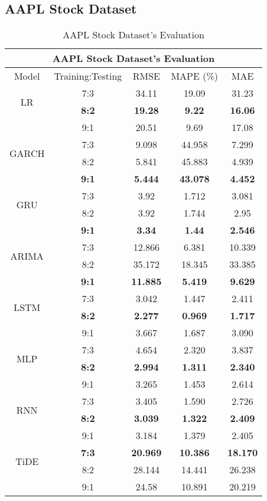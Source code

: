 \documentclass{ieeeojies}
\begin{document}
\subsection{AAPL Stock Dataset} 
\begin{table}[H]
    \centering
    \begin{tabular}{|c|c|c|c|c|}
         \hline
         \multicolumn{5}{|c|}{\textbf{AAPL Stock Dataset's Evaluation}}\\
         \hline
         \centering Model & Training:Testing & RMSE & MAPE (\%) & MAE\\
         \hline
         \multirow{2}{*}{LR} & 7:3 & 34.11 & 19.09 & 31.23 
         \\ & \textbf{8:2} & \textbf{19.28} & \textbf{9.22} & \textbf{16.06} 
         \\ & 9:1 & 20.51 & 9.69 & 17.08\\
         \hline
         \multirow{2}{*}{GARCH} & 7:3&9.098&44.958&7.299\\ & 8:2&5.841&45.883&4.939\\ & \textbf{9:1}& \textbf{5.444}& \textbf{43.078}& \textbf{4.452}\\
         \hline
         \multirow{2}{*}{GRU} & 7:3& 3.92& 1.712& 3.081\\ & 8:2 & 3.92& 1.744& 2.95\\ & \textbf{9:1} & \textbf{3.34}& \textbf{1.44}& \textbf{2.546}\\
         \hline
         \multirow{2}{*}{ARIMA} & 7:3 & 12.866 & 6.381 & 10.339 \\ & 8:2 & 35.172 & 18.345 & 33.385 \\ & \textbf{9:1} & \textbf{11.885}  & \textbf{5.419} & \textbf{9.629}\\
         \hline
         \multirow{2}{*}{LSTM} & 7:3	& 3.042 & 1.447 & 2.411 \\ & \textbf{8:2} & \textbf{2.277} & \textbf{0.969} & \textbf{1.717} \\ & 9:1 & 3.667 & 1.687 & 3.090\\
         \hline
         \multirow{2}{*}{MLP} & 7:3 & 4.654&2.320 & 3.837 \\ & \textbf{8:2} &	\textbf{2.994} & \textbf{1.311} & \textbf{2.340} \\ & 9:1 &3.265	&1.453&2.614\\
         \hline
         \multirow{2}{*}{RNN} & 7:3 & 3.405 & 1.590 & 2.726 
         \\ & \textbf{8:2} & \textbf{3.039} & \textbf{1.322} & \textbf{2.409} 
         \\ & 9:1 &  3.184 &	1.379 & 2.405 \\
         \hline
         \multirow{2}{*}{TiDE} & \textbf{7:3} & \textbf{20.969} & \textbf{10.386} &  \textbf{18.170}
         \\ & 8:2 & 28.144 &  14.441 &  26.238 
         \\ & 9:1 & 24.58 & 10.891 & 20.219\\
         \hline
    \end{tabular}
    \caption{AAPL Stock Dataset's Evaluation}
    \label{vcbresult}
\end{table}
\end{document}
